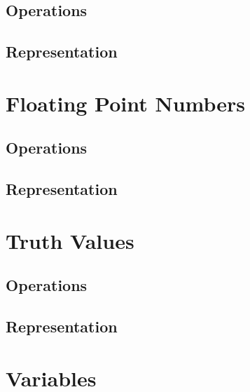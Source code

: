 \subsection{Operations}
\subsection{Representation}
\csharpsubsection{\csharp}

\section{Floating Point Numbers}

\subsection{Operations}
\subsection{Representation}
\csharpsubsection{\csharp}

\section{Truth Values}

\subsection{Operations}
\subsection{Representation}
\csharpsubsection{\csharp}

\section{Variables}
\csharpsubsection{\csharp}

